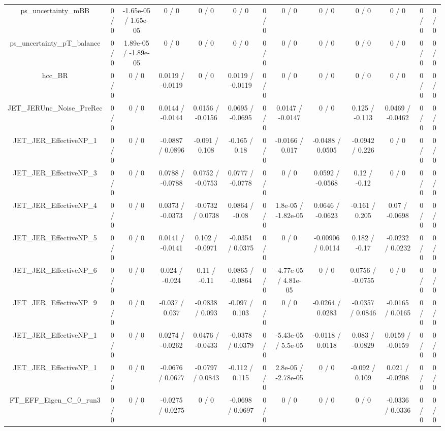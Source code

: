 \documentclass[10pt]{article}
\begin{document}
\begin{table}[htbp]
\begin{center}
\begin{tabular}{|c|c|c|c|c|c|c|c|c|c|c|c|c|}
  ps_uncertainty_mBB & 0 / 0 & -1.65e-05 / 1.65e-05 & 0 / 0 & 0 / 0 & 0 / 0 & 0 / 0 & 0 / 0 & 0 / 0 & 0 / 0 & 0 / 0 & 0 / 0 & 0 / 0 \\ 
  ps_uncertainty_pT_balance & 0 / 0 & 1.89e-05 / -1.89e-05 & 0 / 0 & 0 / 0 & 0 / 0 & 0 / 0 & 0 / 0 & 0 / 0 & 0 / 0 & 0 / 0 & 0 / 0 & 0 / 0 \\ 
  hcc_BR & 0 / 0 & 0 / 0 & 0.0119 / -0.0119 & 0 / 0 & 0.0119 / -0.0119 & 0 / 0 & 0 / 0 & 0 / 0 & 0 / 0 & 0 / 0 & 0 / 0 & 0 / 0 \\ 
  JET_JERUnc_Noise_PreRec & 0 / 0 & 0 / 0 & 0.0144 / -0.0144 & 0.0156 / -0.0156 & 0.0695 / -0.0695 & 0 / 0 & 0.0147 / -0.0147 & 0 / 0 & 0.125 / -0.113 & 0.0469 / -0.0462 & 0 / 0 & 0 / 0 \\ 
  JET_JER_EffectiveNP_1 & 0 / 0 & 0 / 0 & -0.0887 / 0.0896 & -0.091 / 0.108 & -0.165 / 0.18 & 0 / 0 & -0.0166 / 0.017 & -0.0488 / 0.0505 & -0.0942 / 0.226 & 0 / 0 & 0 / 0 & 0 / 0 \\ 
  JET_JER_EffectiveNP_3 & 0 / 0 & 0 / 0 & 0.0788 / -0.0788 & 0.0752 / -0.0753 & 0.0777 / -0.0778 & 0 / 0 & 0 / 0 & 0.0592 / -0.0568 & 0.12 / -0.12 & 0 / 0 & 0 / 0 & 0 / 0 \\ 
  JET_JER_EffectiveNP_4 & 0 / 0 & 0 / 0 & 0.0373 / -0.0373 & -0.0732 / 0.0738 & 0.0864 / -0.08 & 0 / 0 & 1.8e-05 / -1.82e-05 & 0.0646 / -0.0623 & -0.161 / 0.205 & 0.07 / -0.0698 & 0 / 0 & 0 / 0 \\ 
  JET_JER_EffectiveNP_5 & 0 / 0 & 0 / 0 & 0.0141 / -0.0141 & 0.102 / -0.0971 & -0.0354 / 0.0375 & 0 / 0 & 0 / 0 & -0.00906 / 0.0114 & 0.182 / -0.17 & -0.0232 / 0.0232 & 0 / 0 & 0 / 0 \\ 
  JET_JER_EffectiveNP_6 & 0 / 0 & 0 / 0 & 0.024 / -0.024 & 0.11 / -0.11 & 0.0865 / -0.0864 & 0 / 0 & -4.77e-05 / 4.81e-05 & 0 / 0 & 0.0756 / -0.0755 & 0 / 0 & 0 / 0 & 0 / 0 \\ 
  JET_JER_EffectiveNP_9 & 0 / 0 & 0 / 0 & -0.037 / 0.037 & -0.0838 / 0.093 & -0.097 / 0.103 & 0 / 0 & 0 / 0 & -0.0264 / 0.0283 & -0.0357 / 0.0846 & -0.0165 / 0.0165 & 0 / 0 & 0 / 0 \\ 
  JET_JER_EffectiveNP_1 & 0 / 0 & 0 / 0 & 0.0274 / -0.0262 & 0.0476 / -0.0433 & -0.0378 / 0.0379 & 0 / 0 & -5.43e-05 / 5.5e-05 & -0.0118 / 0.0118 & 0.083 / -0.0829 & 0.0159 / -0.0159 & 0 / 0 & 0 / 0 \\ 
  JET_JER_EffectiveNP_1 & 0 / 0 & 0 / 0 & -0.0676 / 0.0677 & -0.0797 / 0.0843 & -0.112 / 0.115 & 0 / 0 & 2.8e-05 / -2.78e-05 & 0 / 0 & -0.092 / 0.109 & 0.021 / -0.0208 & 0 / 0 & 0 / 0 \\ 
  FT_EFF_Eigen_C_0_run3 & 0 / 0 & 0 / 0 & -0.0275 / 0.0275 & 0 / 0 & -0.0698 / 0.0697 & 0 / 0 & 0 / 0 & 0 / 0 & 0 / 0 & -0.0336 / 0.0336 & 0 / 0 & 0 / 0 \\ 

\end{tabular}
\end{center}
\end{table}
\end{document}
